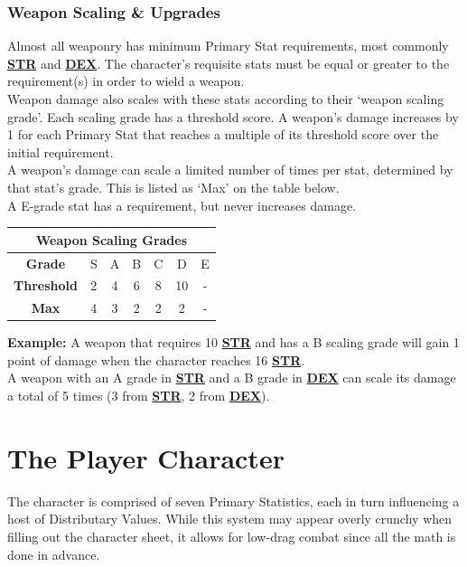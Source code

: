 \documentclass[12pt]{article}
\newcommand{\refto}[1]{\hyperlink{#1}{\textbf{#1}}}
\begin{document}
\begin{multicols*}{2}
\subsubsection{Weapon Scaling \& Upgrades}
Almost all weaponry has minimum Primary Stat requirements, most commonly \refto{STR} and \refto{DEX}. The character’s requisite stats must be equal or greater to the requirement(s) in order to wield a weapon.\\
Weapon damage also scales with these stats according to their ‘weapon scaling grade’. Each scaling grade has a threshold score. A weapon’s damage increases by 1 for each Primary Stat that reaches a multiple of its threshold score over the initial requirement. \\
A weapon’s damage can scale a limited number of times per stat, determined by that stat’s grade. This is listed as ‘Max’ on the table below.\\
A E-grade stat has a requirement, but never increases damage.
\setlength{\tabcolsep}{10pt}
\renewcommand{\arraystretch}{1.5}
\begin{center}
\begin{tabular}{ |c|c|c|c|c|c|c| }
\hline
\multicolumn{7}{|c|}{\textbf{Weapon Scaling Grades}}\\
\hline
\textbf{Grade} & S & A & B & C & D & E \\
\hline
\textbf{Threshold} & 2 & 4 & 6 & 8 & 10 & - \\ 
\hline
\textbf{Max} & 4 & 3 & 2 & 2 & 2 & - \\
\hline
\end{tabular}
\end{center}

\begin{tcolorbox}
\textbf{Example:} A weapon that requires 10 \refto{STR} and has a B scaling grade will gain 1 point of damage when the character reaches 16 \refto{STR}.\\
A weapon with an A grade in \refto{STR} and a B grade in \refto{DEX} can scale its damage a total of 5 times (3 from \refto{STR}, 2 from \refto{DEX}).
\end{tcolorbox}

\vfill
\pagebreak

\section{The Player Character}
The character is comprised of seven Primary Statistics, each in turn influencing a host of Distributary Values. While this system may appear overly crunchy when filling out the character sheet, it allows for low-drag combat since all the math is done in advance.\\


\end{multicols*}
\end{document}
